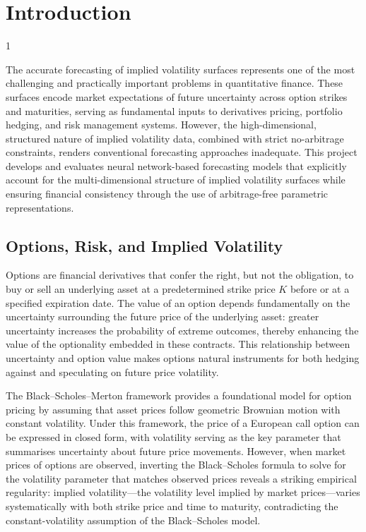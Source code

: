 \doublespacing %

\chapter{Introduction}
\label{ch1}

\begin{spacing}{1} %
\minitoc %
\end{spacing} %
\thesisspacing %

The accurate forecasting of implied volatility surfaces represents one of the most challenging and practically important problems in quantitative finance. These surfaces encode market expectations of future uncertainty across option strikes and maturities, serving as fundamental inputs to derivatives pricing, portfolio hedging, and risk management systems. However, the high-dimensional, structured nature of implied volatility data, combined with strict no-arbitrage constraints, renders conventional forecasting approaches inadequate. This project develops and evaluates neural network-based forecasting models that explicitly account for the multi-dimensional structure of implied volatility surfaces while ensuring financial consistency through the use of arbitrage-free parametric representations.

\section{Options, Risk, and Implied Volatility}

Options are financial derivatives that confer the right, but not the obligation, to buy or sell an underlying asset at a predetermined strike price $K$ before or at a specified expiration date. The value of an option depends fundamentally on the uncertainty surrounding the future price of the underlying asset: greater uncertainty increases the probability of extreme outcomes, thereby enhancing the value of the optionality embedded in these contracts. This relationship between uncertainty and option value makes options natural instruments for both hedging against and speculating on future price volatility.

The Black--Scholes--Merton framework \cite{BlaSch:73,Mer:73} provides a foundational model for option pricing by assuming that asset prices follow geometric Brownian motion with constant volatility. Under this framework, the price of a European call option can be expressed in closed form, with volatility serving as the key parameter that summarises uncertainty about future price movements. However, when market prices of options are observed, inverting the Black--Scholes formula to solve for the volatility parameter that matches observed prices reveals a striking empirical regularity: implied volatility—the volatility level implied by market prices—varies systematically with both strike price and time to maturity, contradicting the constant-volatility assumption of the Black--Scholes model.

